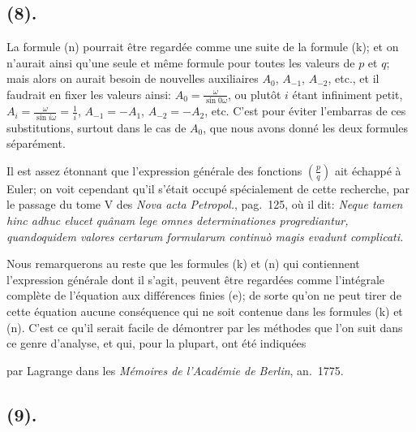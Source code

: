 \documentclass{article}
\begin{document}
\subsection*{(8).}

La formule (n) pourrait être regardée comme une suite de la formule (k); et on n'aurait ainsi qu'une seule et même formule pour toutes les valeurs de $p$ et $q$; mais alors on aurait besoin de nouvelles auxiliaires $A_{0}$, $A_{-1}$, $A_{-2}$, etc., et il faudrait en fixer les valeurs ainsi: $A_{0}=\frac{\omega}{\sin 0\omega}$, ou plutôt $i$ étant infiniment petit, $A_{i}=\frac{\omega}{\sin i\omega}=\frac{1}{i}$, $A_{-1}=-A_{1}$, $A_{-2}=-A_{2}$, etc. C'est pour éviter l'embarras de ces substitutions, surtout dans le cas de $A_{0}$, que nous avons donné les deux formules séparément.

Il est assez étonnant que l'expression générale des fonctions $\left(\frac{p}{q}\right)$ ait échappé à Euler; on voit cependant qu'il s'était occupé spécialement de cette recherche, par le passage du tome V des \emph{Nova acta Petropol.}, pag.\ 125, où il dit: \emph{Neque tamen hinc adhuc elucet quânam lege omnes determinationes progrediantur, quandoquidem valores certarum formularum continuò magis evadunt complicati.}

Nous remarquerons au reste que les formules (k) et (n) qui contiennent l'expression générale dont il s'agit, peuvent être regardées comme l'intégrale complète de l'équation aux différences finies (e); de sorte qu'on ne peut tirer de cette équation aucune conséquence qui ne soit contenue dans les formules (k) et (n). C'est ce qu'il serait facile de démontrer par les méthodes que l'on suit dans ce genre d'analyse, et qui, pour la plupart, ont été indiquées

par Lagrange dans les \emph{Mémoires de l'Académie de Berlin}, an.\ 1775.

\subsection*{(9).}
\end{document}
